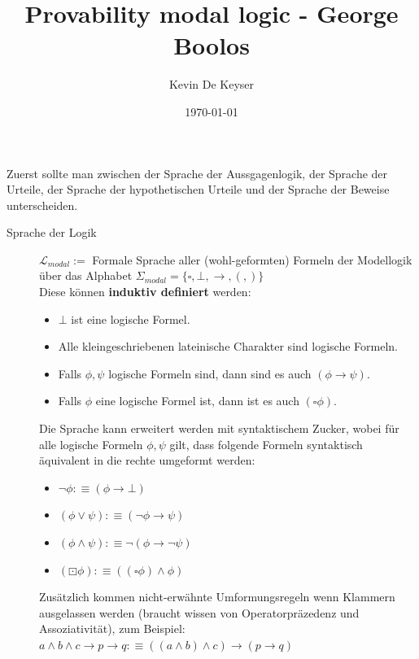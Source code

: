 \documentclass[a4paper,oneside]{article} %
\begin{document}

	\title{Provability modal logic - George Boolos}
	\date{\today}
	\author{Kevin De Keyser}

	\maketitle
	
	Zuerst sollte man zwischen der Sprache der Aussgagenlogik, der Sprache der Urteile, der Sprache der hypothetischen Urteile und der Sprache der Beweise unterscheiden.
	
	\begin{description}
	\item[Sprache der Logik] $\mathcal{L}_{modal} :=$ Formale Sprache aller (wohl-geformten) Formeln der Modellogik über das Alphabet $\Sigma_{modal} = \{\square,\bot,\rightarrow,(,)\}$ \\
		Diese können \textbf{induktiv definiert} werden:
	\begin{itemize}
		\item $\bot$ ist eine logische Formel.
		\item Alle kleingeschriebenen lateinische Charakter sind logische Formeln.
		\item Falls $\phi, \psi$ logische Formeln sind, dann sind es auch $(\phi \rightarrow \psi)$.
		\item Falls $\phi$ eine logische Formel ist, dann ist es auch $(\square \phi)$.
	\end{itemize}

	Die Sprache kann erweitert werden mit syntaktischem Zucker, wobei für alle logische Formeln $\phi,\psi$ gilt, dass folgende Formeln syntaktisch äquivalent in die rechte umgeformt werden:
	\begin{itemize}
	\item $\neg \phi :\equiv (\phi \rightarrow \bot)$
	\item $(\phi \vee \psi) :\equiv (\neg \phi \rightarrow \psi)$
	\item $(\phi \wedge \psi) :\equiv \neg (\phi \rightarrow \neg \psi)$
	\item $(\boxdot \phi) :\equiv ((\square \phi) \wedge \phi)$
	\end{itemize}

	Zusätzlich kommen nicht-erwähnte Umformungsregeln wenn Klammern ausgelassen werden (braucht wissen von Operatorpräzedenz und Assoziativität), zum Beispiel:
	$a \wedge b \wedge c \rightarrow p \rightarrow q :\equiv ((a \wedge b) \wedge c) \rightarrow (p \rightarrow q)$ 
	

\end{description}
\end{document}
